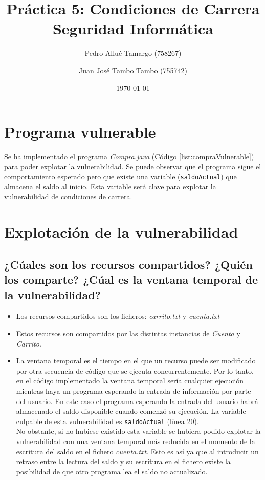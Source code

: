 \documentclass{article}
\begin{document}
\begin{titlepage}
\title{\textbf{
    {\Huge Práctica 5: Condiciones de Carrera}\\
    {\Large Seguridad Informática}
}}
\author{
    Pedro Allué Tamargo (758267)
    \and
    Juan José Tambo Tambo (755742)
}
\date{\today}
\clearpage\maketitle
\thispagestyle{empty}
\tableofcontents
\end{titlepage}

\section{Programa vulnerable}

Se ha implementado el programa \textit{Compra.java} (Código \ref{list:compraVulnerable}) para poder explotar la vulnerabilidad. Se puede observar que el programa sigue el comportamiento esperado pero que existe una variable (\texttt{saldoActual}) que almacena el saldo al inicio. Esta variable será clave para explotar la vulnerabilidad de condiciones de carrera.\\


\section{Explotación de la vulnerabilidad}

\subsection{¿Cúales son los recursos compartidos? ¿Quién los comparte? ¿Cúal es la ventana temporal de la vulnerabilidad?}
\begin{itemize}
    \item Los recursos compartidos son los ficheros: \textit{carrito.txt} y \textit{cuenta.txt}
    \item Estos recursos son compartidos por las distintas instancias de \textit{Cuenta} y \textit{Carrito}.
    \item La ventana temporal es el tiempo en el que un recurso puede ser modificado por otra secuencia de código que se ejecuta concurrentemente. Por lo tanto, en el código implementado la ventana temporal sería cualquier ejecución mientras haya un programa esperando la entrada de información por parte del usuario. En este caso el programa esperando la entrada del usuario habrá almacenado el saldo disponible cuando comenzó su ejecución. La variable culpable de esta vulnerabilidad es \texttt{saldoActual} (línea 20).\\
    No obstante, si no hubiese existido esta variable se hubiera podido explotar la vulnerabilidad con una ventana temporal más reducida en el momento de la escritura del saldo en el fichero \textit{cuenta.txt}. Esto es así ya que al introducir un retraso entre la lectura del saldo y su escritura en el fichero existe la posibilidad de que otro programa lea el saldo no actualizado.
\end{itemize}
\end{document}
